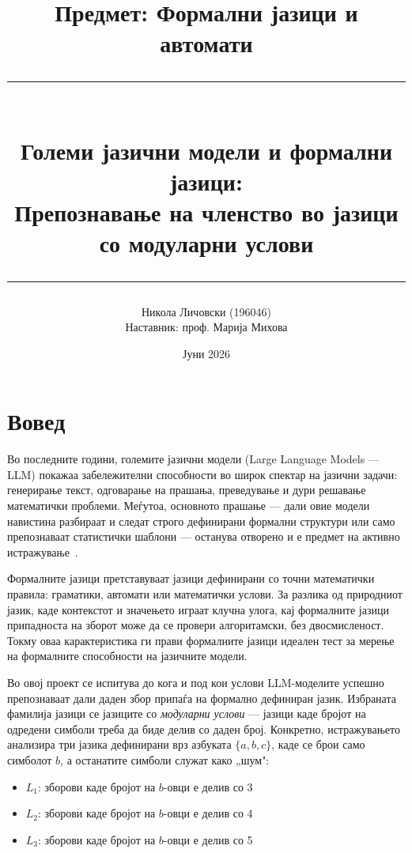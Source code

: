 \documentclass[12pt,a4paper]{article}
\title{
  \vspace{-1cm}
  {\large Предмет: Формални јазици и автомати}\\[0.8cm]
  \rule{\linewidth}{0.5pt}\\[0.4cm]
  {\LARGE\bfseries Големи јазични модели и формални јазици:\\[0.2cm]
  Препознавање на членство во јазици со модуларни услови}\\[0.4cm]
  \rule{\linewidth}{0.5pt}
}
\author{
  Никола Личовски \quad (196046)\\[0.3cm]
  {\small Наставник: проф. Марија Михова}
}
\date{Јуни 2026}
\theoremstyle{definition}
\begin{document}

\maketitle
\thispagestyle{empty}
\newpage

\tableofcontents
\newpage

\section{Вовед}

Во последните години, големите јазични модели (Large Language Models --- LLM) покажаа забележителни способности во широк спектар на јазични задачи: генерирање текст, одговарање на прашања, преведување и дури решавање математички проблеми. Меѓутоа, основното прашање --- дали овие модели навистина разбираат и следат строго дефинирани формални структури или само препознаваат статистички шаблони --- останува отворено и е предмет на активно истражување~\cite{deletang2023chomsky,bhattamishra2020ability}.

Формалните јазици претставуваат јазици дефинирани со точни математички правила: граматики, автомати или математички услови. За разлика од природниот јазик, каде контекстот и значењето играат клучна улога, кај формалните јазици припадноста на зборот може да се провери алгоритамски, без двосмисленост. Токму оваа карактеристика ги прави формалните јазици идеален тест за мерење на формалните способности на јазичните модели.

Во овој проект се испитува до кога и под кои услови LLM-моделите успешно препознаваат дали даден збор припаѓа на формално дефиниран јазик. Избраната фамилија јазици се јазиците со \textit{модуларни услови} --- јазици каде бројот на одредени симболи треба да биде делив со даден број. Конкретно, истражувањето анализира три јазика дефинирани врз азбуката $\{a, b, c\}$, каде се брои само симболот $b$, а останатите симболи служат како „шум":

\begin{itemize}
  \item $L_1$: зборови каде бројот на $b$-овци е делив со 3
  \item $L_2$: зборови каде бројот на $b$-овци е делив со 4
  \item $L_3$: зборови каде бројот на $b$-овци е делив со 5
\end{itemize}
\end{document}
